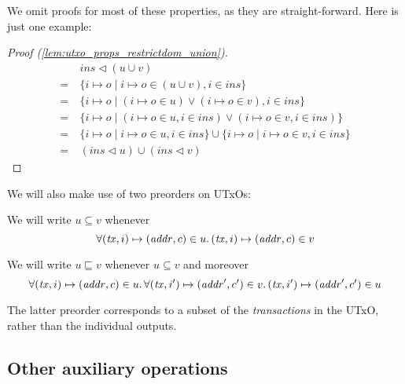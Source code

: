 \documentclass{article}
\newcommand{\restrictdom}{\lhd}
\theoremstyle{definition}{
  \newtheorem{lemma}{Lemma}[section] %
  \newtheorem{definition}[lemma]{Definition}
}
\theoremstyle{theorem}{
  \newtheorem{invariant}[lemma]{Invariant}
  \newtheorem{proofobligation}[lemma]{Proof Obligation}
}
\numberwithin{equation}{lemma}
\begin{document}
We omit proofs for most of these properties, as they are straight-forward.
Here is just one example:
%
\begin{proof}[Proof (\cref{lem:utxo_props_restrictdom_union})]
\begin{align*}
  & ~ \mathit{ins} \restrictdom (u \cup v) \\
= & ~ \{ i \mapsto o \mid i \mapsto o \in (u \cup v), i \in \mathit{ins} \} \\
= & ~ \{ i \mapsto o \mid (i \mapsto o \in u) \vee (i \mapsto o \in v), i \in \mathit{ins} \} \\
= & ~ \{ i \mapsto o \mid (i \mapsto o \in u, i \in \mathit{ins}) \vee (i \mapsto o \in v, i \in \mathit{ins}) \} \\
= & ~ \{ i \mapsto o \mid i \mapsto o \in u, i \in \mathit{ins} \} \cup \{ i \mapsto o \mid i \mapsto o \in v, i \in \mathit{ins} \} \\
= & ~ (\mathit{ins} \restrictdom u) \cup (\mathit{ins} \restrictdom v)
\end{align*}
\end{proof}

We will also make use of two preorders on UTxOs:

\begin{definition}[$u \subseteq v$]
We will write $u \subseteq v$ whenever
\begin{equation*}
\forall (\mathit{tx}, i)  \mapsto (\mathit{addr}, c) \in u \ldotp
(\mathit{tx}, i)  \mapsto (\mathit{addr}, c) \in v
\end{equation*}
\end{definition}

\begin{definition}[$u \sqsubseteq v$]
We will write $u \sqsubseteq v$ whenever $u \subseteq v$ and moreover
\begin{equation*}
\forall (\mathit{tx}, i)  \mapsto (\mathit{addr}, c) \in u \ldotp
\forall (\mathit{tx}, i') \mapsto (\mathit{addr}', c') \in v \ldotp
(\mathit{tx}, i') \mapsto (\mathit{addr}', c') \in u
\end{equation*}
\end{definition}

The latter preorder corresponds to a subset of the \emph{transactions}
in the UTxO, rather than the individual outputs.

\subsection{Other auxiliary operations}
\end{document}
